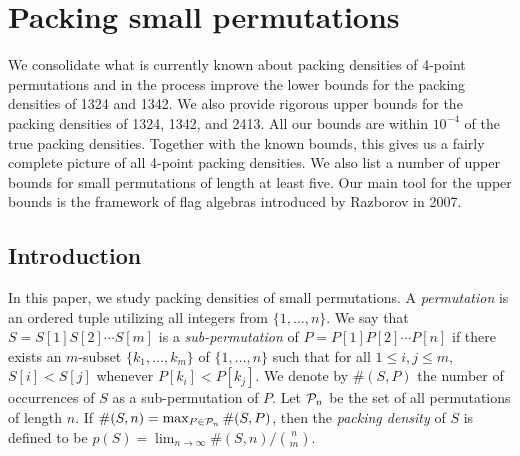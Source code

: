 \chapter{Packing small permutations}
\label{chap:packsmall}
We consolidate what is currently known about packing densities of 4-point permutations and in the process improve the lower bounds for the packing densities of 1324 and 1342. We also provide rigorous upper bounds for the packing densities of 1324, 1342, and 2413. All our bounds are within $10^{-4}$ of the true packing densities. Together with the known bounds, this gives us a fairly complete picture of all 4-point packing densities. We also list a number of upper bounds for small permutations of length at least five. Our main tool for the upper bounds is the framework of flag algebras introduced by Razborov in 2007.




\section{Introduction}
\label{sec:intro}

In this paper, we study packing densities of small permutations. A \emph{permutation} is an ordered tuple utilizing all integers from $\{1,\ldots,n\}$. We say that $S = S[1]S[2]\cdots S[m] $ is a \emph{sub-permutation} of $P=P[1]P[2]\cdots P[n]$ if there exists an $m$-subset $\{k_1,\ldots,k_m\}$ of $\{1,\ldots,n\}$ such that for all $1 \leq i,j \leq m$, $S[i] < S[j]$ whenever $P[k_i] < P[k_j]$. We denote by $\#(S,P)$ the number of occurrences of $S$ as a sub-permutation of $P$. Let $\P_n$ be the set of all permutations of length $n$. If $\#(S,n) = \max_{P \in \P_n}\#(S,P)$, then the \emph{packing density} of $S$ is defined to be $p(S) = \lim_{n\to\infty} \#(S,n)/\binom{n}{m}.$



